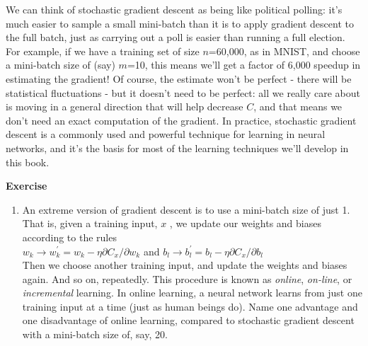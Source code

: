 We can think of stochastic gradient descent as being like political polling: it's much easier to sample a small mini-batch than it is to apply gradient descent to the full batch, just as carrying out a poll is easier than running a full election. For example, if we have a training set of size $n$=60,000, as in MNIST, and choose a mini-batch size of (say) $m$=10, this means we'll get a factor of 6,000 speedup in estimating the gradient! Of course, the estimate won't be perfect - there will be statistical fluctuations - but it doesn't need to be perfect: all we really care about is moving in a general direction that will help decrease $C$, and that means we don't need an exact computation of the gradient. In practice, stochastic gradient descent is a commonly used and powerful technique for learning in neural networks, and it's the basis for most of the learning techniques we'll develop in this book.

\textbf{Exercise}
\begin{enumerate}
\item 
 An extreme version of gradient descent is to use a mini-batch size of just 1. That is, given a training input, $x$ , we update our weights and biases according to the rules \\
 $w_{k} \rightarrow w_{k}^{\prime}=w_{k}-\eta \partial C_{x} / \partial w_{k}$ and $b_{l} \rightarrow b_{l}^{\prime}=b_{l}-\eta \partial C_{x} / \partial b_{l}$\\
 Then we choose another training input, and update the weights and biases again. And so on, repeatedly. This procedure is known as \textit{online}, \textit{on-line}, or \textit{incremental} learning. In online learning, a neural network learns from just one training input at a time (just as human beings do). Name one advantage and one disadvantage of online learning, compared to stochastic gradient descent with a mini-batch size of, say, 20. 


\end{enumerate}

